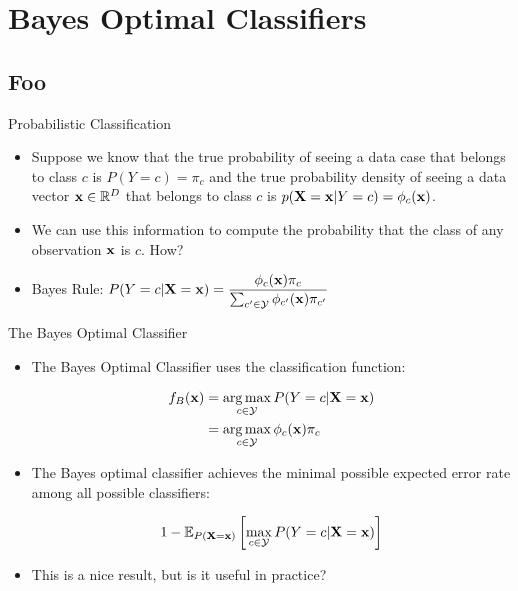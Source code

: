 \documentclass[serif,xcolor=pdftex,dvipsnames,table,hyperref={bookmarks=false}]{beamer}
\begin{document}
\section{Bayes Optimal Classifiers}
\subsection{Foo}


\begin{frame}[t]{Probabilistic Classification}

\begin{itemize}
\item Suppose we know that the true probability of seeing a data case that
belongs to class $c$ is $P(Y=c)=\pi_c$ and the true probability density of seeing a data vector ${\mathbf{x}}\in\mathbb{R}^D$ that belongs to class $c$ is $p({\mathbf{X}}={\mathbf{x}}|Y=c) =\phi_c({\mathbf{x}})$.

\pause\item We can use this information to compute the probability that the class of any observation ${\mathbf{x}}$ is $c$. How?

\pause\item Bayes Rule:
$\displaystyle P(Y=c|{\mathbf{X}}={\mathbf{x}}) = \frac{\phi_c({\mathbf{x}})\pi_c}{\sum_{c'\in\mathcal{Y}}\phi_{c'}({\mathbf{x}})\pi_{c'}}$

\end{itemize}

\end{frame}

\begin{frame}[t]{The Bayes Optimal Classifier}

\begin{itemize}
\item The Bayes Optimal Classifier uses the classification function: 

{
\Large
\begin{align*}
f_{B}({\mathbf{x}})&=\operatorname*{arg\,max}_{c\in\mathcal{Y}} P(Y=c|{\mathbf{X}}={\mathbf{x}})\\
&=\operatorname*{arg\,max}_{c\in\mathcal{Y}} \phi_c({\mathbf{x}})\pi_c
\end{align*}
}

\pause\item The Bayes optimal classifier achieves the minimal possible expected error rate among all possible classifiers:

$$1 - \mathbb{E}_{P({\mathbf{X}}={\mathbf{x}})}\left[\max_{c\in\mathcal{Y}} P(Y=c|{\mathbf{X}}={\mathbf{x}})\right]$$

\pause \item This is a nice result, but is it useful in practice?

\end{itemize}

\end{frame}
\end{document}
